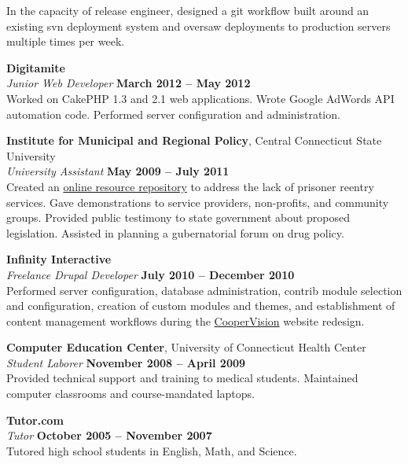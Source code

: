 \documentclass[margin,line]{resume}
\begin{document}
\begin{resume}
    In the capacity of release engineer, designed a git workflow built around an existing svn deployment system and oversaw deployments to production servers multiple times per week.

    \textbf{Digitamite} \vspace{2mm}\\\vspace{1mm}%
    \textsl{Junior Web Developer} \hfill \textbf{March 2012 -- May 2012}\\
    Worked on CakePHP 1.3 and 2.1 web applications. Wrote Google AdWords API automation code. Performed server configuration and administration.

    \textbf{Institute for Municipal and Regional Policy}, Central Connecticut State University \vspace{2mm}\\\vspace{1mm}%
    \textsl{University Assistant} \hfill \textbf{May 2009 -- July 2011}\\
    Created an \href{http://www.ctreentry.info}{online resource repository} to address the lack of prisoner reentry services. Gave demonstrations to service providers, non-profits, and community groups. Provided public testimony to state government about proposed legislation. Assisted in planning a gubernatorial forum on drug policy.

    \textbf{Infinity Interactive} \vspace{2mm}\\\vspace{1mm}%
    \textsl{Freelance Drupal Developer} \hfill \textbf{July 2010 -- December 2010}\\
    Performed server configuration, database administration, contrib module selection and configuration, creation of custom modules and themes, and establishment of content management workflows during the \href{http://www.coopervision.com}{CooperVision} website redesign.

    \textbf{Computer Education Center}, University of Connecticut Health Center\vspace{2mm}\\\vspace{1mm}%
    \textsl{Student Laborer} \hfill \textbf{November 2008 -- April 2009}\\
    Provided technical support and training to medical students. Maintained computer classrooms and course-mandated laptops.

    \textbf{Tutor.com}\vspace{2mm}\\\vspace{1mm}%
    \textsl{Tutor} \hfill \textbf{October 2005 -- November 2007}\\
    Tutored high school students in English, Math, and Science.


\end{resume}
\end{document}
